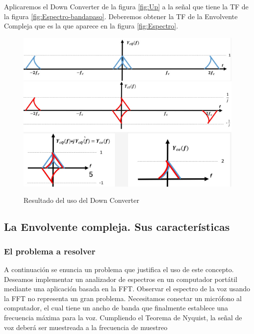 Aplicaremos el Down Converter de la figura \ref{fig:Up} a la señal que tiene la TF de la figura \ref{fig:Espectro-bandapaso}. Deberemos obtener la TF de la Envolvente Compleja que es la que aparece en la figura \ref{fig:Espectro}.

\begin{figure}[h!]
	\captionsetup{justification = raggedright, singlelinecheck = false}
	\caption{Resultado del uso del Down Converter} 
	\centering
	\includegraphics[scale=0.9]{Imagenes/resultado.png}
	\label{fig:resultado-down}
\end{figure}


\subsection{La Envolvente compleja. Sus características}
\subsubsection{El problema a resolver}

A continuación se enuncia un problema que justifica el uso de este concepto.\\

Deseamos implementar un analizador de espectros  en un computador portátil mediante una aplicación basada en la FFT. Observar el espectro de la voz usando la FFT no representa un gran problema. Necesitamos conectar un micrófono al computador, el cual tiene un ancho de banda que finalmente establece una frecuencia máxima para la voz. Cumpliendo el Teorema de Nyquist, la señal de voz deberá ser muestreada a la frecuencia de muestreo \\ 

